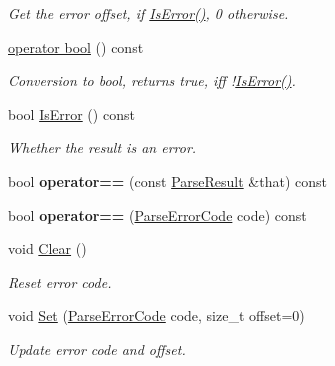 \begin{DoxyCompactItemize}
\begin{DoxyCompactList}\small\item\em Get the error offset, if \hyperlink{a00230_a07c35a6769f5cb8a73cbc56c41e60a2a}{Is\+Error()}, 0 otherwise. \end{DoxyCompactList}\item 
\hyperlink{a00230_a74ab79dfa41d390002d1ea188a749bce}{operator bool} () const \hypertarget{a00230_a74ab79dfa41d390002d1ea188a749bce}{}\label{a00230_a74ab79dfa41d390002d1ea188a749bce}

\begin{DoxyCompactList}\small\item\em Conversion to {\ttfamily bool}, returns {\ttfamily true}, iff !\hyperlink{a00230_a07c35a6769f5cb8a73cbc56c41e60a2a}{Is\+Error()}. \end{DoxyCompactList}\item 
bool \hyperlink{a00230_a07c35a6769f5cb8a73cbc56c41e60a2a}{Is\+Error} () const \hypertarget{a00230_a07c35a6769f5cb8a73cbc56c41e60a2a}{}\label{a00230_a07c35a6769f5cb8a73cbc56c41e60a2a}

\begin{DoxyCompactList}\small\item\em Whether the result is an error. \end{DoxyCompactList}\item 
bool {\bfseries operator==} (const \hyperlink{a00230}{Parse\+Result} \&that) const \hypertarget{a00230_a90794619408c295ffa923f3307526bed}{}\label{a00230_a90794619408c295ffa923f3307526bed}

\item 
bool {\bfseries operator==} (\hyperlink{a00832_ga8d4b32dfc45840bca189ade2bbcb6ba7}{Parse\+Error\+Code} code) const \hypertarget{a00230_a5a0bd70f5bbb383ac63a6450ac4ae4d1}{}\label{a00230_a5a0bd70f5bbb383ac63a6450ac4ae4d1}

\item 
void \hyperlink{a00230_a88b6d44f052a19e6436ae6aadc2c40b4}{Clear} ()\hypertarget{a00230_a88b6d44f052a19e6436ae6aadc2c40b4}{}\label{a00230_a88b6d44f052a19e6436ae6aadc2c40b4}

\begin{DoxyCompactList}\small\item\em Reset error code. \end{DoxyCompactList}\item 
void \hyperlink{a00230_aa81b4a7b776b77216cb752385203a8c1}{Set} (\hyperlink{a00832_ga8d4b32dfc45840bca189ade2bbcb6ba7}{Parse\+Error\+Code} code, size\+\_\+t offset=0)\hypertarget{a00230_aa81b4a7b776b77216cb752385203a8c1}{}\label{a00230_aa81b4a7b776b77216cb752385203a8c1}

\begin{DoxyCompactList}\small\item\em Update error code and offset. \end{DoxyCompactList}\end{DoxyCompactItemize}
